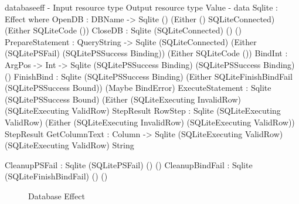 \begin{SaveVerbatim}{databaseeff}
{-                           { Input resource type }    { Output resource type }             { Value }           -}
data Sqlite : Effect where
  OpenDB            : DBName -> 
                      Sqlite ()                         (Either () SQLiteConnected)          (Either SQLiteCode ())
  CloseDB           : Sqlite (SQLiteConnected)          ()                                   ()
  PrepareStatement  : QueryString -> 
                      Sqlite (SQLiteConnected)          (Either (SQLitePSFail) 
                                                          (SQLitePSSuccess Binding))         (Either SQLiteCode ())
  BindInt           : ArgPos -> Int -> 
                      Sqlite (SQLitePSSuccess Binding)  (SQLitePSSuccess Binding)            ()
  FinishBind        : Sqlite (SQLitePSSuccess Binding)  (Either SQLiteFinishBindFail
                                                          (SQLitePSSuccess Bound))           (Maybe BindError)
  ExecuteStatement  : Sqlite (SQLitePSSuccess Bound)    (Either (SQLiteExecuting InvalidRow)
                                                          (SQLiteExecuting ValidRow)         StepResult
  RowStep           : Sqlite (SQLiteExecuting ValidRow) (Either (SQLiteExecuting InvalidRow)
                                                          (SQLiteExecuting ValidRow))        StepResult
  GetColumnText     : Column -> 
                      Sqlite (SQLiteExecuting ValidRow) (SQLiteExecuting ValidRow)           String
                      
  CleanupPSFail     : Sqlite (SQLitePSFail)             ()                                   ()
  CleanupBindFail   : Sqlite (SQLiteFinishBindFail)     ()                                   ()

\end{SaveVerbatim}

\begin{figure*}[t]
\begin{center}
\end{center}
\caption{Database Effect}
\label{fig:dbeffect}
\end{figure*}


